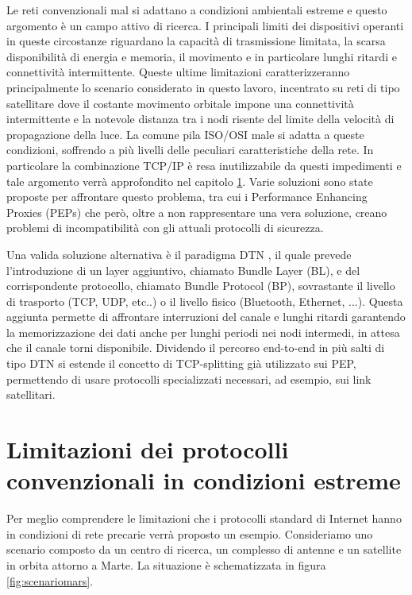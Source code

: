 \documentclass[12pt,a4paper,oneside]{book}
\begin{document}
		Le reti convenzionali mal si adattano a condizioni ambientali estreme e questo argomento è un campo attivo di ricerca. I principali limiti dei dispositivi operanti in queste circostanze riguardano la capacità di trasmissione limitata, la scarsa disponibilità di energia e memoria, il movimento e in particolare lunghi ritardi e connettività intermittente. Queste ultime limitazioni caratterizzeranno principalmente lo scenario considerato in questo lavoro, incentrato su reti di tipo satellitare dove il costante movimento orbitale impone una connettività intermittente e la notevole distanza tra i nodi risente del limite della velocità di propagazione della luce. La comune pila ISO/OSI male si adatta a queste condizioni, soffrendo a più livelli delle peculiari caratteristiche della rete. In particolare la combinazione TCP/IP è resa inutilizzabile da questi impedimenti e tale argomento verrà approfondito nel capitolo \ref{limProt}. Varie soluzioni sono state proposte per affrontare questo problema, tra cui i Performance Enhancing Proxies (PEPs) \cite{borderperformance} che però, oltre a non rappresentare una vera soluzione, creano problemi di incompatibilità con gli attuali protocolli di sicurezza.
		
		Una valida soluzione alternativa è il paradigma DTN \cite{caini2011delay}, il quale prevede l'introduzione di un layer aggiuntivo, chiamato Bundle Layer (BL)\cite{cerf2007rfc}, e del corrispondente protocollo, chiamato Bundle Protocol (BP)\cite{scott2007bundle}, sovrastante il livello di trasporto (TCP, UDP, etc..) o il livello fisico (Bluetooth, Ethernet, ...). Questa aggiunta permette di affrontare interruzioni del canale e lunghi ritardi garantendo la memorizzazione dei dati anche per lunghi periodi nei nodi intermedi, in attesa che il canale torni disponibile. Dividendo il percorso end-to-end in più salti di tipo DTN si estende il concetto di TCP-splitting già utilizzato sui PEP, permettendo di usare protocolli specializzati necessari, ad esempio, sui link satellitari.
		
		\section{Limitazioni dei protocolli convenzionali in condizioni estreme} \label{limProt}
		
		Per meglio comprendere le limitazioni che i protocolli standard di Internet hanno in condizioni di rete precarie verrà proposto un esempio. Consideriamo uno scenario composto da un centro di ricerca, un complesso di antenne e un satellite in orbita attorno a Marte. La situazione è schematizzata in figura \ref{fig:scenariomars}. 
		
\end{document}
